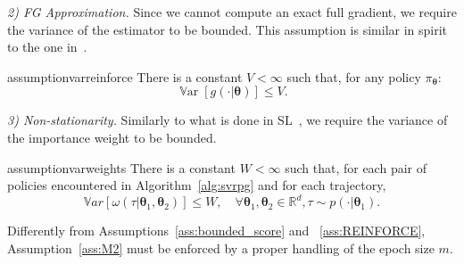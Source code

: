 \documentclass{article}
\theoremstyle{remark}
\theoremstyle{definition}
\newcommand{\realspace}{\mathbb R}      %
\DeclareMathOperator*{\Var}{\mathbb{V}ar}
\newcommand{\vtheta}{\boldsymbol{\theta}}
\newcommand{\pol}{\pi_{\vtheta}}
\newcommand{\VARRF}{V}
\newcommand{\VARIS}{W}
\begin{document}
\textit{2) FG Approximation.}
Since we cannot compute an exact full gradient, we require the variance of the estimator to be bounded.
This assumption is similar in spirit to the one in~\citep{harikandeh2015stopwasting}.
	\begin{restatable}{assumption}{varreinforce}\label{ass:REINFORCE}
		There is a constant $V<\infty$ such that, for any policy $\pol$:
		\[
			\Var\left[g(\cdot\vert\vtheta)\right] \leq \VARRF.
		\]
	\end{restatable}

\textit{3) Non-stationarity.} 
Similarly to what is done in SL~\citep{cortes2010learning}, we require the variance of the importance weight to be bounded.
	\begin{restatable}{assumption}{varweights}\label{ass:M2}
		There is a constant $W<\infty$ such that, for each pair of policies encountered in Algorithm~\ref{alg:svrpg} and for each trajectory,
		\[
                \mathbb{V}ar\left[\omega(\tau| \vtheta_1, \vtheta_2)\right] \leq \VARIS, \quad \forall \vtheta_1,\vtheta_2 \in \realspace^d , \tau \sim p(\cdot|\vtheta_1).
		\]
	\end{restatable}
Differently from Assumptions~\ref{ass:bounded_score} and ~\ref{ass:REINFORCE}, Assumption~\ref{ass:M2} must be enforced by a proper handling of the epoch size $m$.
\end{document}
